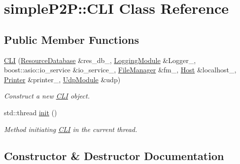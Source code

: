 \hypertarget{classsimpleP2P_1_1CLI}{}\section{simple\+P2P\+:\+:C\+LI Class Reference}
\label{classsimpleP2P_1_1CLI}
\subsection*{Public Member Functions}
\begin{DoxyCompactItemize}
\item 
\hyperlink{classsimpleP2P_1_1CLI_ae49d8df884d3161610e810563df7ed29}{C\+LI} (\hyperlink{classsimpleP2P_1_1ResourceDatabase}{Resource\+Database} \&res\+\_\+db\+\_\+, \hyperlink{classsimpleP2P_1_1LoggingModule}{Logging\+Module} \&Logger\+\_\+, boost\+::asio\+::io\+\_\+service \&io\+\_\+service\+\_\+, \hyperlink{classsimpleP2P_1_1FileManager}{File\+Manager} \&fm\+\_\+, \hyperlink{classsimpleP2P_1_1Host}{Host} \&localhost\+\_\+, \hyperlink{classsimpleP2P_1_1Printer}{Printer} \&printer\+\_\+, \hyperlink{classsimpleP2P_1_1UdpModule}{Udp\+Module} \&udp)
\begin{DoxyCompactList}\small\item\em Construct a new \hyperlink{classsimpleP2P_1_1CLI}{C\+LI} object. \end{DoxyCompactList}\item 
std\+::thread \hyperlink{classsimpleP2P_1_1CLI_a66ffb438b7ad05e349f6469bf5574521}{init} ()
\begin{DoxyCompactList}\small\item\em Method initiating \hyperlink{classsimpleP2P_1_1CLI}{C\+LI} in the current thread. \end{DoxyCompactList}\end{DoxyCompactItemize}


\subsection{Constructor \& Destructor Documentation}
\mbox{\label{classsimpleP2P_1_1CLI_ae49d8df884d3161610e810563df7ed29}} 
